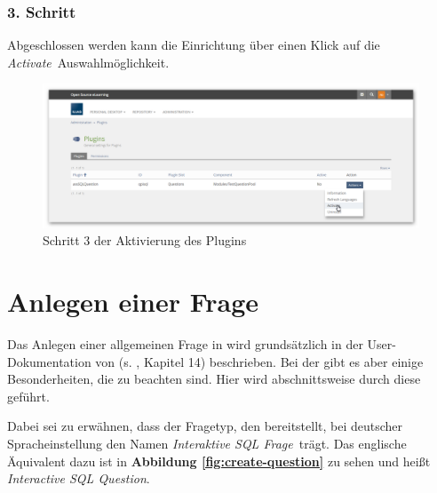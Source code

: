     \subsubsection{3. Schritt}
    
        Abgeschlossen werden kann die Einrichtung über einen Klick auf die \glqq\textit{Activate}\grqq\ Auswahlmöglichkeit.
        
            \begin{figure}[H]
                \begin{center}
                    \includegraphics[page=1, width=0.7\paperwidth, trim=4 4 4 4, clip]{fig/Schritt-3-Aktivierung.png} 
                    \caption{Schritt 3 der Aktivierung des  Plugins}
                    \label{fig:schritt-3-aktivierung}
                \end{center}
            \end{figure}


\section{Anlegen einer Frage}
\label{sec:anlegen-einer-frage}

Das Anlegen einer allgemeinen Frage in  wird grundsätzlich in der User-Dokumentation von  (s. \cite{IliasAutorenDokumentation}, Kapitel 14) beschrieben. Bei der  gibt es aber einige Besonderheiten, die zu beachten sind. Hier wird abschnittsweise durch diese geführt.

Dabei sei zu erwähnen, dass der Fragetyp, den  bereitstellt, bei deutscher Spracheinstellung den Namen \glqq\textit{Interaktive SQL Frage}\grqq\ trägt. Das englische Äquivalent dazu ist in \textbf{Abbildung \ref{fig:create-question}} zu sehen und heißt \glqq\textit{Interactive SQL Question}\grqq .

